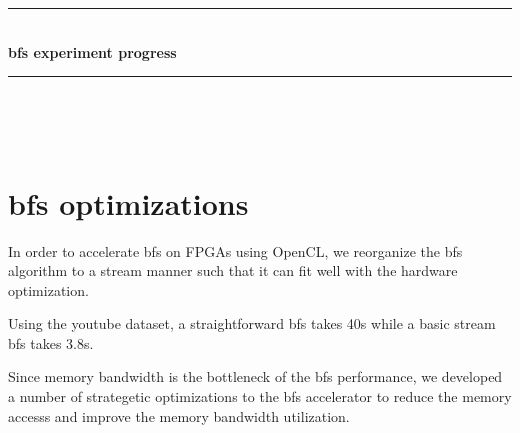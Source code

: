 \documentclass[12pt]{article} %
\begin{document}

\begin{titlepage}

\newcommand{\HRule}{\rule{\linewidth}{0.5mm}} %

\center %

\HRule \\[0.4cm]
{ \huge \bfseries bfs experiment progress}\\[0.4cm] %
\HRule \\[1.5cm]

\begin{minipage}{0.4\textwidth}
     \\ 
    \vspace{2em}
    \centering {\large \today}
\end{minipage}

\end{titlepage}




\section{bfs optimizations} %
In order to accelerate bfs on FPGAs using OpenCL, we reorganize 
the bfs algorithm to a stream manner such that it can fit well 
with the hardware optimization.

Using the youtube dataset, a straightforward bfs takes 40s while a basic stream bfs 
takes 3.8s.

Since memory bandwidth is the bottleneck of the bfs performance, we developed a number of 
strategetic optimizations to the bfs accelerator to reduce the memory accesss and improve the 
memory bandwidth utilization.
\end{document}
